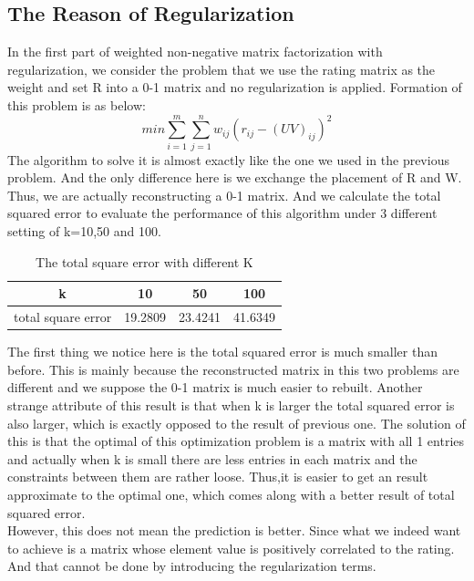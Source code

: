 \documentclass{article}
\begin{document}
\subsection{The Reason of Regularization}
In the first part of weighted non-negative matrix factorization with regularization, we consider the problem that we use the rating matrix as the weight and set R into a 0-1 matrix and no regularization is applied. Formation of this problem is as below:
\begin{equation}
min\sum_{i=1}^{m}\sum_{j=1}^{n}w_{ij}{(r_{ij}-{(UV)}_{ij})}^2
\end{equation}
The algorithm to solve it is almost exactly like the one we used in the previous problem. And the only difference here is we exchange the placement of R and W. Thus, we are actually reconstructing a 0-1 matrix. And we calculate the total squared error to evaluate the performance of this algorithm under 3 different setting of k=10,50 and 100.
\begin{table}
\begin{center}
\caption{The total square error with different K}
\label{tb:k}
\begin{tabular}{|c|c|c|c|}
\hline
k& 10& 50 & 100\\
\hline
total square error&19.2809&23.4241&41.6349\\
\hline
\end{tabular}
\end{center}
\end{table}
The first thing we notice here is the total squared error is much smaller than before. This is mainly because the reconstructed matrix in this two problems are different and we suppose the 0-1 matrix is much easier to rebuilt. Another strange attribute of this result is that when k is larger the total squared error is also larger, which is exactly opposed to the result of previous one. The solution of this is that the optimal of this optimization problem is a matrix with all 1 entries and actually when k is small there are less entries in each matrix and the constraints between them are rather loose. Thus,it is easier to get an result approximate to the optimal one, which comes along with a better result of total squared error.\\
However, this does not mean the prediction is better. Since what we indeed want to achieve is a matrix whose element value is positively correlated to the rating. And that cannot be done by introducing the regularization terms.\\
\end{document}

